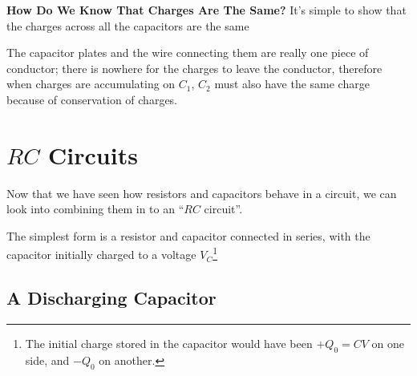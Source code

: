 

\textbf{How Do We Know That Charges Are The Same?} It's simple to show that the
charges across all the capacitors are the same
\begin{figure}[ht]
  \centering
\end{figure}
The capacitor plates and the wire connecting them are really one piece of
conductor; there is nowhere for the charges to leave the conductor, therefore
when charges are accumulating on $C_1$, $C_2$ must also have the same charge
because of conservation of charges.



\section{$RC$ Circuits}
%
Now that we have seen how resistors and capacitors behave in a circuit, we can
look into combining them in to an ``$RC$ circuit''.

The simplest form is a resistor and capacitor connected in series, with the
capacitor initially charged to a voltage $V_C$\footnote{The initial charge
stored in the capacitor would have been $+Q_0=CV$ on one side, and $-Q_0$ on
another.}
%
%
%
\subsection{A Discharging Capacitor}

